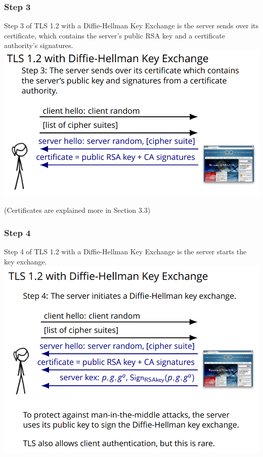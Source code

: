 \documentclass[11pt]{article} %
\begin{document}
{\newpage
\subsubsection{Step 3}
Step 3 of TLS 1.2 with a Diffie-Hellman Key Exchange is the server sends over 
its certificate, which contains the server’s public RSA key and a certificate 
authority's signatures.\\

\includegraphics[scale=.8]{./DiffieStep3.png}

(Certificates are explained more in Section 3.3)

\subsubsection{Step 4}
Step 4 of TLS 1.2 with a Diffie-Hellman Key Exchange is the server starts the 
key exchange.\\

\includegraphics[scale=.8]{./DiffieStep4.png}

}
\end{document}

